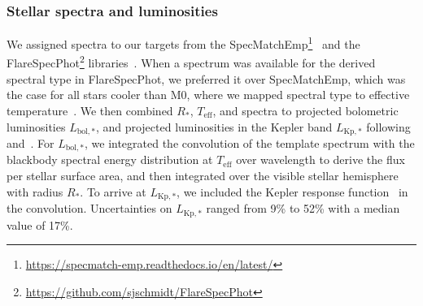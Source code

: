 \documentclass{aa}
\begin{document}
\subsubsection{Stellar spectra and luminosities}
\label{sec:lum}
We assigned spectra to our targets from the SpecMatchEmp\footnote{\url{https://specmatch-emp.readthedocs.io/en/latest/}}~\citep{yee_specmatch_2017} and the FlareSpecPhot\footnote{\url{https://github.com/sjschmidt/FlareSpecPhot}} libraries~\citep{Kirkpatrick2010, Burgasser2007, Burgasser2008, Burgasser2010, Burgasser2004, Cruz2004, Burgasser2006, Rayner2009, Doi2010, Filippazzo2015, Cruz2003, West2011, Bochanski2010,  Bochanski2007, Schmidt2010, schmidt2015, Schmidt2014a, Schmidt2014b, mann_how_2015}. When a spectrum was available for the derived spectral type in FlareSpecPhot, we preferred it over SpecMatchEmp, which was the case for all stars cooler than M0, where we mapped spectral type to effective temperature~\citep{pecaut_intrinsic_2013}. We then combined $R_*$, $T_\mathrm{eff}$, and spectra to projected bolometric luminosities $L_{\mathrm{bol,*}}$, and projected luminosities in the Kepler band $L_{\mathrm{Kp,*}}$ following~\citet{shibayama2013} and~. For $L_{\mathrm{bol,*}}$, we integrated the convolution of the template spectrum with the blackbody spectral energy distribution at $T_\mathrm{eff}$ over wavelength to derive the flux per stellar surface area, and then integrated over the visible stellar hemisphere with radius $R_*$. To arrive at $L_{\mathrm{Kp,*}}$, we included the Kepler response function~\citep{vancleve2016} in the convolution. Uncertainties on $L_{\mathrm{Kp,*}}$ ranged from 9\;\% to 52\;\% with a median value of 17\;\%.
\end{document}
